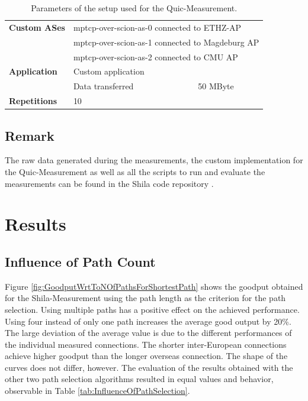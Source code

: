 \begin{table} [H]
	\centering
	\begin{tabular}{lll} 
		\toprule
		\textbf{Custom ASes} 		& \multicolumn{2}{l}{mptcp-over-scion-as-0 connected to ETHZ-AP}				\\
		& \multicolumn{2}{l}{mptcp-over-scion-as-1 connected to Magdeburg AP}			\\
		& \multicolumn{2}{l}{mptcp-over-scion-as-2 connected to CMU AP}					\smallskip \\ 
		\textbf{Application}		& Custom application						&								\\
		& Data transferred								& 50 MByte						\smallskip\\
		\textbf{Repetitions} 		& 10 											&								\\
		\bottomrule
	\end{tabular}
	\caption{Parameters of the setup used for the Quic-Measurement.}
	\label{tab:ParameterQuicMeasurement}
\end{table}

\subsection*{Remark}
\label{subsec:SetupRemarks}

The raw data generated during the measurements, the custom implementation for the Quic-Measurement as well as all the scripts to run and evaluate the measurements can be found in the Shila code repository \cite{ShilaGithub}.

\section{Results}
\label{sec:Results}

\subsection*{Influence of Path Count}
\label{subsec:InfluencePathCount}

Figure \ref{fig:GoodputWrtToNOfPathsForShortestPath} shows the goodput obtained for the Shila-Measurement using the path length as the criterion for the path selection. Using multiple paths has a positive effect on the achieved performance.  Using four instead of only one path increases the average good output by 20\%. The large deviation of the average value is due to the different performances of the individual measured connections. The shorter inter-European connections achieve higher goodput than the longer overseas connection. The shape of the curves does not differ, however. The evaluation of the results obtained with the other two path selection algorithms resulted in equal values and behavior, observable in Table \ref{tab:InfluenceOfPathSelection}.

